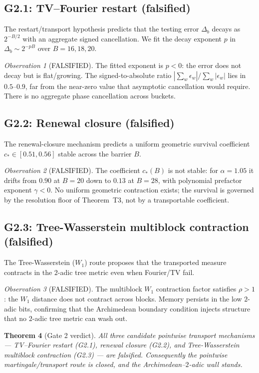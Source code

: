 \documentclass[12pt,a4paper]{article}
\newtheorem{theorem}{Theorem}[section]
\theoremstyle{remark}
\newtheorem{observation}[theorem]{Observation}
\begin{document}
\subsection{G2.1: TV--Fourier restart (falsified)}
The restart/transport hypothesis predicts that the testing error $\Delta_b$
decays as $2^{-B/2}$ with an aggregate signed cancellation. We fit the decay
exponent $p$ in $\Delta_b \sim 2^{-pB}$ over $B=16,18,20$.
\begin{observation}[FALSIFIED]
The fitted exponent is $p<0$: the error does not decay but is flat/growing.
The signed-to-absolute ratio $|\sum_w\epsilon_w|/\sum_w|\epsilon_w|$ lies in
$0.5$--$0.9$, far from the near-zero value that asymptotic cancellation would
require. There is no aggregate phase cancellation across buckets.
\end{observation}

\subsection{G2.2: Renewal closure (falsified)}
The renewal-closure mechanism predicts a uniform geometric survival coefficient
$c_*\in[0.51,0.56]$ stable across the barrier $B$.
\begin{observation}[FALSIFIED]
The coefficient $c_*(B)$ is not stable: for $\alpha=1.05$ it drifts from
$0.90$ at $B=20$ down to $0.13$ at $B=28$, with polynomial prefactor exponent
$\gamma<0$. No uniform geometric contraction exists; the survival is governed
by the resolution floor of Theorem~T3, not by a transportable coefficient.
\end{observation}

\subsection{G2.3: Tree-Wasserstein multiblock contraction (falsified)}
The Tree-Wasserstein ($W_1$) route proposes that the transported measure
contracts in the $2$-adic tree metric even when Fourier/TV fail.
\begin{observation}[FALSIFIED]
The multiblock $W_1$ contraction factor satisfies $\rho>1$: the $W_1$ distance
does not contract across blocks. Memory persists in the low $2$-adic bits,
confirming that the Archimedean boundary condition injects structure that no
$2$-adic tree metric can wash out.
\end{observation}

\begin{theorem}[Gate 2 verdict]
\label{thm:gate2_verdict}
All three candidate pointwise transport mechanisms --- TV--Fourier restart
(G2.1), renewal closure (G2.2), and Tree-Wasserstein multiblock contraction
(G2.3) --- are falsified. Consequently the pointwise martingale/transport route
is closed, and the Archimedean--$2$-adic wall stands.
\end{theorem}
\end{document}
